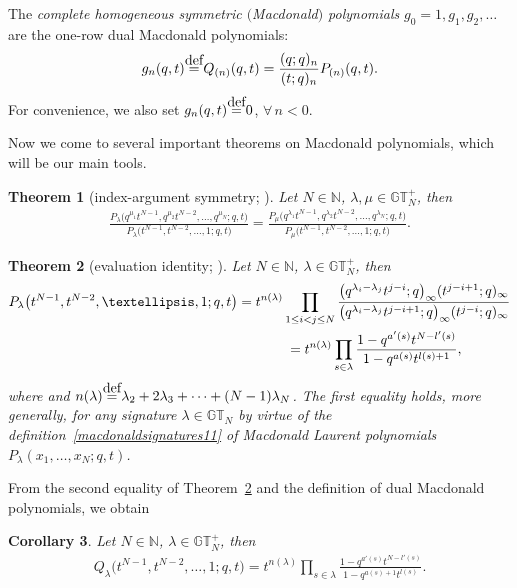 \documentclass[11pt]{article}
\numberwithin{equation}{section}
\newcommand\myeq{\mathrel{\stackrel{\makebox[0pt]{\mbox{\normalfont\tiny def}}}{=}}}
\newtheorem{thm}{Theorem}[section]
\newtheorem{cor}[thm]{Corollary}
\newcommand{\N}{\mathbb{N}}
\newcommand{\GT}{\mathbb{GT}}
\newcommand{\GTp}{\mathbb{GT}^+}
\begin{document}
The \textit{complete homogeneous symmetric $($Macdonald$)$ polynomials} $g_0 = 1, g_1, g_2, \dots$ are the one-row dual Macdonald polynomials:
\begin{gather}\label{gtoQ}
g_n(q, t) \myeq Q_{(n)}(q, t) = \frac{(q; q)_n}{(t; q)_n}P_{(n)}(q, t).
\end{gather}
For convenience, we also set $g_n(q, t) \myeq 0$, $\forall\, n < 0$.

Now we come to several important theorems on Macdonald polynomials, which will be our main tools.

\begin{thm}[{index-argument symmetry; \cite[Chapter~VI, Property~6.6]{M2}}]\label{symmetry}
Let $N\in\N$, $\lambda, \mu\in\GTp_N$, then
\begin{gather*}
\frac{P_{\lambda}\big(q^{\mu_1}t^{N-1}, q^{\mu_2}t^{N-2}, \dots, q^{\mu_N}; q, t\big)}{P_{\lambda}\big(t^{N-1}, t^{N-2}, \dots, 1; q, t\big)} = \frac{P_{\mu}\big(q^{\lambda_1}t^{N-1}, q^{\lambda_2}t^{N-2}, \dots, q^{\lambda_N}; q, t\big)}{P_{\mu}\big(t^{N-1}, t^{N-2}, \dots, 1; q, t\big)}.
\end{gather*}
\end{thm}

\begin{thm}[{evaluation identity; \cite[Chapter~VI, equations~(6.11) and~(6.11$'$)]{M2}}]\label{evaluation}
Let $N\in\N$, $\lambda\in\GTp_N$, then
\begin{gather*}
P_{\lambda}\big(t^{N-1}, t^{N-2}, \dots, 1; q, t\big) = t^{n(\lambda)}\prod_{1\leq i<j\leq N}{\frac{\big(q^{\lambda_i - \lambda_j}t^{j-i}; q\big)_{\infty}(t^{j-i+1}; q)_{\infty} }{ \big(q^{\lambda_i - \lambda_j}t^{j-i+1}; q\big)_{\infty} (t^{j-i}; q)_{\infty}}}\\
\hphantom{P_{\lambda}\big(t^{N-1}, t^{N-2}, \dots, 1; q, t\big)}{} = t^{n(\lambda)}\prod_{s\in\lambda}{\frac{1 - q^{a'(s)}t^{N - l'(s)}}{1 - q^{a(s)}t^{l(s)+1}}},
\end{gather*}
where and $n(\lambda) \myeq \lambda_2 + 2\lambda_3 + \cdots + (N-1)\lambda_N$.
The first equality holds, more generally, for any signature $\lambda\in\GT_N$ by virtue of the definition~\eqref{macdonaldsignatures11} of Macdonald Laurent polynomials $P_{\lambda}(x_1, \dots, x_N; q, t)$.
\end{thm}

From the second equality of Theorem~\ref{evaluation} and the def\/inition of dual Macdonald polynomials, we obtain

\begin{cor}\label{evaluationcor}
Let $N\in\N$, $\lambda\in\GTp_N$, then
\begin{gather*}
Q_{\lambda}\big(t^{N-1}, t^{N-2}, \dots, 1; q, t\big) = t^{n(\lambda)}\prod_{s\in\lambda}{\frac{1 - q^{a'(s)}t^{N - l'(s)}}{1 - q^{a(s)+1}t^{l(s)}}}.
\end{gather*}
\end{cor}
\end{document}
